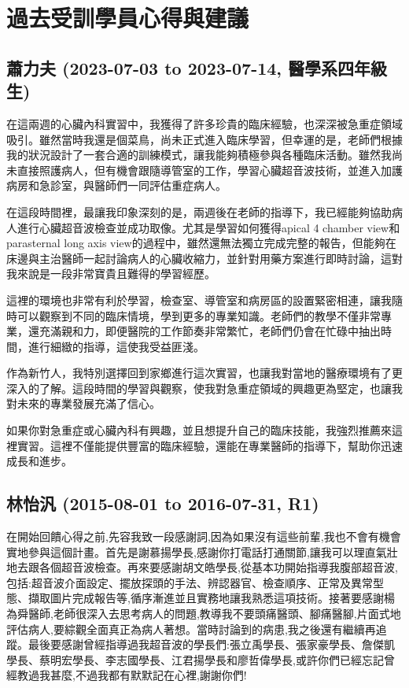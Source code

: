 \documentclass[12pt,a4paper]{article}
\begin{document}
\newpage

\section{過去受訓學員心得與建議}
\subsection{蕭力夫 (2023-07-03 to 2023-07-14, 醫學系四年級生)}
在這兩週的心臟內科實習中，我獲得了許多珍貴的臨床經驗，也深深被急重症領域吸引。雖然當時我還是個菜鳥，尚未正式進入臨床學習，但幸運的是，老師們根據我的狀況設計了一套合適的訓練模式，讓我能夠積極參與各種臨床活動。雖然我尚未直接照護病人，但有機會跟隨導管室的工作，學習心臟超音波技術，並進入加護病房和急診室，與醫師們一同評估重症病人。

在這段時間裡，最讓我印象深刻的是，兩週後在老師的指導下，我已經能夠協助病人進行心臟超音波檢查並成功取像。尤其是學習如何獲得apical 4 chamber view和parasternal long axis view的過程中，雖然還無法獨立完成完整的報告，但能夠在床邊與主治醫師一起討論病人的心臟收縮力，並針對用藥方案進行即時討論，這對我來說是一段非常寶貴且難得的學習經歷。

這裡的環境也非常有利於學習，檢查室、導管室和病房區的設置緊密相連，讓我隨時可以觀察到不同的臨床情境，學到更多的專業知識。老師們的教學不僅非常專業，還充滿親和力，即便醫院的工作節奏非常繁忙，老師們仍會在忙碌中抽出時間，進行細緻的指導，這使我受益匪淺。

作為新竹人，我特別選擇回到家鄉進行這次實習，也讓我對當地的醫療環境有了更深入的了解。這段時間的學習與觀察，使我對急重症領域的興趣更為堅定，也讓我對未來的專業發展充滿了信心。

如果你對急重症或心臟內科有興趣，並且想提升自己的臨床技能，我強烈推薦來這裡實習。這裡不僅能提供豐富的臨床經驗，還能在專業醫師的指導下，幫助你迅速成長和進步。

\subsection{林怡汎 (2015-08-01 to 2016-07-31, R1)}
在開始回饋心得之前,先容我致一段感謝詞,因為如果沒有這些前輩,我也不會有機會實地參與這個計畫。首先是謝慕揚學長,感謝你打電話打通關節,讓我可以理直氣壯地去跟各個超音波檢查。再來要感謝胡文皓學長,從基本功開始指導我腹部超音波,包括:超音波介面設定、擺放探頭的手法、辨認器官、檢查順序、正常及異常型態、擷取圖片完成報告等,循序漸進並且實務地讓我熟悉這項技術。接著要感謝楊為舜醫師,老師很深入去思考病人的問題,教導我不要頭痛醫頭、腳痛醫腳,片面式地評估病人,要綜觀全面真正為病人著想。當時討論到的病患,我之後還有繼續再追蹤。最後要感謝曾經指導過我超音波的學長們:張立禹學長、張家豪學長、詹傑凱學長、蔡明宏學長、李志國學長、江君揚學長和廖哲偉學長,或許你們已經忘記曾經教過我甚麼,不過我都有默默記在心裡,謝謝你們!
\end{document}
